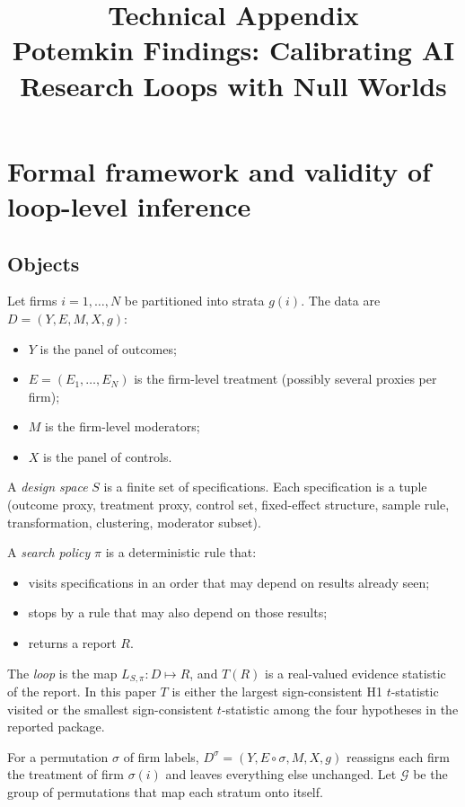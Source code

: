 \documentclass[11pt]{article}
\title{\textbf{Technical Appendix}\\[2pt]\large Potemkin Findings: Calibrating AI Research Loops with Null Worlds}
\date{}
\theoremstyle{remark}\newtheorem{remark}{Remark}
\begin{document}
\maketitle
\tableofcontents
\clearpage

\section{Formal framework and validity of loop-level inference}\label{sec:theory}

\subsection{Objects}
Let firms $i=1,\dots,N$ be partitioned into strata $g(i)$. The data are $D=(Y,E,M,X,g)$:
\begin{itemize}
\item $Y$ is the panel of outcomes;
\item $E=(E_1,\dots,E_N)$ is the firm-level treatment (possibly several proxies per firm);
\item $M$ is the firm-level moderators;
\item $X$ is the panel of controls.
\end{itemize}
A \emph{design space} $S$ is a finite set of specifications. Each specification is a tuple (outcome proxy, treatment proxy,
control set, fixed-effect structure, sample rule, transformation, clustering, moderator subset).

A \emph{search policy} $\pi$ is a deterministic rule that:
\begin{itemize}
\item visits specifications in an order that may depend on results already seen;
\item stops by a rule that may also depend on those results;
\item returns a report $R$.
\end{itemize}
The \emph{loop} is the map $L_{S,\pi}:D\mapsto R$, and $T(R)$ is a real-valued evidence statistic of the report. In this
paper $T$ is either the largest sign-consistent H1 $t$-statistic visited or the smallest sign-consistent $t$-statistic
among the four hypotheses in the reported package.

For a permutation $\sigma$ of firm labels, $D^{\sigma}=(Y,E\circ\sigma,M,X,g)$ reassigns each firm the treatment of firm
$\sigma(i)$ and leaves everything else unchanged. Let $\mathcal G$ be the group of permutations that map each stratum onto
itself.
\end{document}
